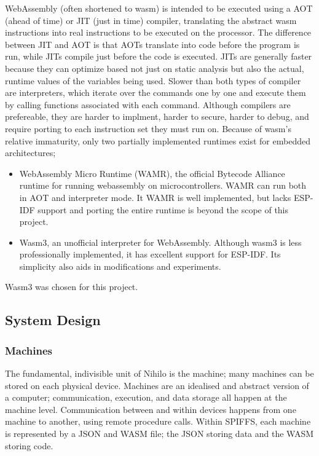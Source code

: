 \documentclass{article}
\begin{document}
WebAssembly (often shortened to wasm) is intended to be executed using a AOT (ahead of time)  or JIT (just in time) compiler, translating the abstract wasm instructions into real instructions to be executed on the processor.
The difference between JIT and AOT is that AOTs translate into code before the program is run, while JITs compile just before the code is executed.
JITs are generally faster because they can optimize based not just on static analysis but also the actual, runtime values of the variables being used.
Slower than both types of compiler are interpreters, which iterate over the commands one by one and execute them by calling functions associated with each command.
Although compilers are prefereable, they are harder to implment, harder to secure, harder to debug, and require porting to each instruction set they must run on.
Because of wasm's relative immaturity, only two partially implemented runtimes exist for embedded architectures;
\begin{itemize}
\item WebAssembly Micro Runtime (WAMR), the official Bytecode Alliance runtime for running webassembly on microcontrollers.
WAMR can run both in AOT and interpreter mode.
It WAMR is well implemented, but lacks ESP-IDF support and porting the entire runtime is beyond the scope of this project.
\item Wasm3, an unofficial interpreter for WebAssembly. 
Although wasm3 is less professionally implemented, it has excellent support for ESP-IDF.
Its simplicity also aids in modifications and experiments. 
\end{itemize}

Wasm3 was chosen for this project.

\subsection{System Design}
\subsubsection{Machines}

The fundamental, indivisible unit of Nihilo is the machine; many machines can be stored on each physical device. Machines are an idealised and abstract version of a computer; communication, execution, and data storage all happen at the machine level. Communication between and within devices happens from one machine to another, using remote procedure calls. Within SPIFFS, each machine is represented by a JSON and WASM file; the JSON storing data and the WASM storing code.
\end{document}
